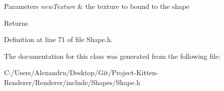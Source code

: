 \begin{DoxyParams}{Parameters}
{\em new\+Texture} & the texture to bound to the shape \\
\hline
\end{DoxyParams}
\begin{DoxyReturn}{Returns}

\end{DoxyReturn}


Definition at line 71 of file Shape.\+h.



The documentation for this class was generated from the following file\+:\begin{DoxyCompactItemize}
\item 
C\+:/\+Users/\+Alexandru/\+Desktop/\+Git/\+Project-\/\+Kitten-\/\+Renderer/\+Renderer/include/\+Shapes/Shape.\+h\end{DoxyCompactItemize}
